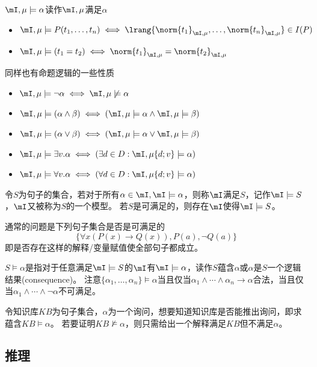 \begin{definition}[满足]
$\mI,\mu\models\alpha$读作$\mI,\mu$满足$\alpha$
\begin{itemize}
	\item $\mI,\mu\models P(t_1,\ldots,t_n)\iff\lrang{\norm{t_1}_{\mI,\mu},\ldots,\norm{t_n}_{\mI,\mu}}\in I(P)$
	\item $\mI,\mu\models(t_1=t_2)\iff\norm{t_1}_{\mI,\mu}=\norm{t_2}_{\mI,\mu}$
\end{itemize}
同样也有命题逻辑的一些性质
\begin{itemize}
	\item $\mI,\mu\models\lnot\alpha\iff\mI,\mu\not\models\alpha$
	\item $\mI,\mu\models(\alpha\land\beta)\iff(\mI,\mu\models\alpha\land\mI,\mu\models\beta)$
	\item $\mI,\mu\models(\alpha\lor\beta)\iff(\mI,\mu\models\alpha\lor\mI,\mu\models\beta)$
	\item $\mI,\mu\models\exists v.\alpha\iff(\exists d\in D:\mI,\mu\{d;v\}\models\alpha)$
	\item $\mI,\mu\models\forall v.\alpha\iff(\forall d\in D:\mI,\mu\{d;v\}\models\alpha)$
\end{itemize}

令$S$为句子的集合，若对于所有$\alpha\in\mI,\mI\models\alpha$，则称$\mI$满足$S$，记作$\mI\models S$，$\mI$又被称为$S$的一个模型。
若$S$是可满足的，则存在$\mI$使得$\mI\models S$。
\end{definition}
\begin{example}
通常的问题是下列句子集合是否是可满足的
\[\{\forall x(P(x)\to Q(x)),P(a),\lnot Q(a)\}\]
即是否存在这样的解释/变量赋值使全部句子都成立。
\end{example}

\begin{definition}[蕴含(entail)]
$S\models\alpha$是指对于任意满足$\mI\models S$的$\mI$有$\mI\models\alpha$，读作$S$蕴含$\alpha$或$\alpha$是$S$一个逻辑结果(consequence)。
注意$\{\alpha_1,\ldots,\alpha_n\}\models\alpha$当且仅当$\alpha_1\land\cdots\land\alpha_n\to\alpha$合法，当且仅当$\alpha_1\land\cdots\land\lnot\alpha$不可满足。
\end{definition}
\begin{example}
令知识库$KB$为句子集合，$\alpha$为一个询问，想要知道知识库是否能推出询问，即求蕴含$KB\models\alpha$。
若要证明$KB\not\models\alpha$，则只需给出一个解释满足$KB$但不满足$\alpha$。
\end{example}

\subsection{推理}
